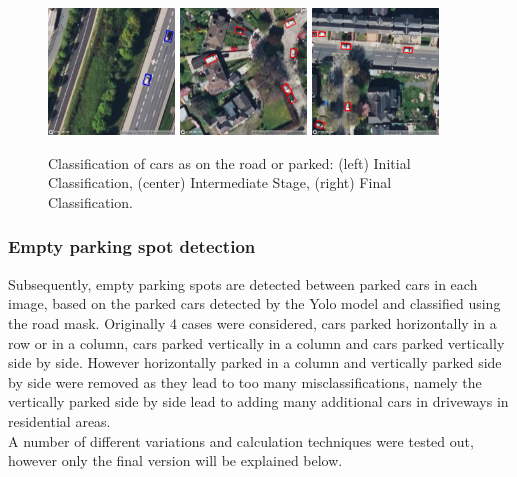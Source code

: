 \begin{figure}[htbp]
  \centering
  \includegraphics[width=0.30\textwidth]{images/road_mask_classification1.png}
  \hfill
  \includegraphics[width=0.30\textwidth]{images/road_mask_classification2.png}
  \hfill
  \includegraphics[width=0.30\textwidth]{images/road_mask_classification3.png}
  \caption{Classification of cars as on the road or parked: (left) Initial Classification, (center) Intermediate Stage, (right) Final Classification.}
  \label{fig:road_mask_classification}
\end{figure}


\newpage

\subsubsection{Empty parking spot detection}
Subsequently, empty parking spots are detected between parked cars in each
image, based on the parked cars detected by the Yolo model and classified using
the road mask. Originally 4 cases were considered, cars parked horizontally in a
row or in a column, cars parked vertically in a column and cars parked
vertically side by side. However horizontally parked in a column and vertically
parked side by side were removed as they lead to too many misclassifications,
namely the vertically parked side by side lead to adding many additional cars in
driveways in residential areas.\\
A number of different variations and calculation techniques were tested out,
however only the final version will be explained below.

